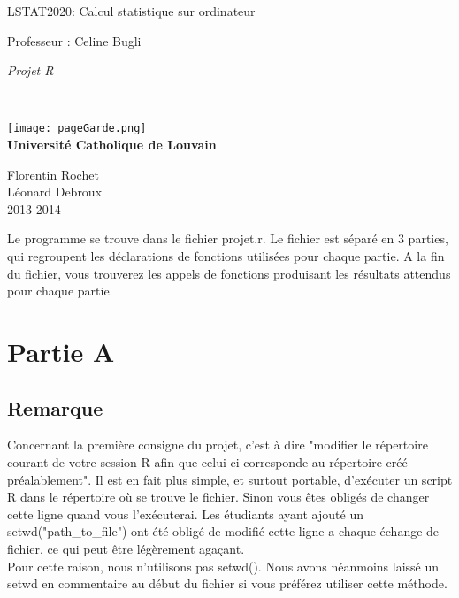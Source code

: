 \documentclass{article}
\begin{document}
\begin{titlepage}
    \begin{center}
        {\huge LSTAT2020: Calcul statistique sur ordinateur}\\
        \vspace{0.4cm}
        
        {\Large {Professeur : Celine Bugli}}\\
        \vspace{0.6cm}
        
        {\Large \textit{Projet R}}\\
        \vspace{1.2cm}

        \texttt{}\\
        \vspace{0.2cm}

        \texttt{[image: pageGarde.png]}\\
        \vspace{0.1cm}
        {\Large \textbf{Universit\'e Catholique de Louvain}}
        \vspace{0.7cm}

        \vspace{2cm}
        
        Florentin Rochet\\
        Léonard Debroux \\
        \vspace{0.2cm}
        2013-2014\\
    \end{center}
\end{titlepage}

Le programme se trouve dans le fichier projet.r. Le fichier est séparé en 3 parties, qui regroupent les déclarations de fonctions utilisées pour chaque partie. A la fin du fichier, vous trouverez les appels de fonctions produisant les résultats attendus pour chaque partie.

\section{Partie A}
\subsection{Remarque}
Concernant la première consigne du projet, c'est à dire "modifier le répertoire courant de votre session R afin que celui-ci corresponde au répertoire créé préalablement". Il est en fait plus simple, et surtout portable, d'exécuter un script R dans le répertoire où se trouve le fichier. Sinon vous êtes obligés de changer cette ligne quand vous l'exécuterai. Les étudiants ayant ajouté un setwd("path\_to\_file") ont été obligé de modifié cette ligne a chaque échange de fichier, ce qui peut être légèrement agaçant.\\
Pour cette raison, nous n'utilisons pas setwd(). Nous avons néanmoins laissé un setwd en commentaire au début du fichier si vous préférez utiliser cette méthode.
\end{document}
